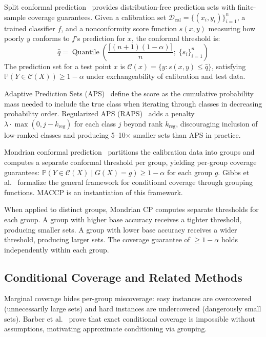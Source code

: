 \documentclass[conference]{IEEEtran}
\newcommand{\calD}{\mathcal{D}}
\newcommand{\calC}{\mathcal{C}}
\newcommand{\PP}{\mathbb{P}}
\DeclareMathOperator{\Quantile}{Quantile}
\begin{document}
Split conformal prediction~\cite{vovk2005algorithmic} provides distribution-free prediction sets with finite-sample coverage guarantees. Given a calibration set $\calD_\text{cal} = \{(x_i, y_i)\}_{i=1}^{n}$, a trained classifier $f$, and a nonconformity score function $s(x,y)$ measuring how poorly $y$ conforms to $f$'s prediction for $x$, the conformal threshold is:
\begin{equation}
\hat{q} = \Quantile\!\left(\frac{\lceil (n+1)(1-\alpha) \rceil}{n};\; \{s_i\}_{i=1}^{n}\right)
\end{equation}
The prediction set for a test point $x$ is $\calC(x) = \{y : s(x,y) \leq \hat{q}\}$, satisfying $\PP(Y \in \calC(X)) \geq 1 - \alpha$ under exchangeability of calibration and test data.

Adaptive Prediction Sets (APS)~\cite{romano2020classification} define the score as the cumulative probability mass needed to include the true class when iterating through classes in decreasing probability order. Regularized APS (RAPS)~\cite{angelopoulos2021uncertainty} adds a penalty $\lambda \cdot \max(0, j - k_\text{reg})$ for each class $j$ beyond rank $k_\text{reg}$, discouraging inclusion of low-ranked classes and producing 5--10$\times$ smaller sets than APS in practice.

Mondrian conformal prediction~\cite{vovk2005algorithmic} partitions the calibration data into groups and computes a separate conformal threshold per group, yielding per-group coverage guarantees: $\PP(Y \in \calC(X) \mid G(X) = g) \geq 1 - \alpha$ for each group $g$. Gibbs et al.~\cite{gibbs2025conditional} formalize the general framework for conditional coverage through grouping functions. MACCP is an instantiation of this framework.

When applied to distinct groups, Mondrian CP computes separate thresholds for each group. A group with higher base accuracy receives a tighter threshold, producing smaller sets. A group with lower base accuracy receives a wider threshold, producing larger sets. The coverage guarantee of $\geq 1 - \alpha$ holds independently within each group.

\subsection{Conditional Coverage and Related Methods}

Marginal coverage hides per-group miscoverage: easy instances are overcovered (unnecessarily large sets) and hard instances are undercovered (dangerously small sets). Barber et al.~\cite{barber2021impossibility} prove that exact conditional coverage is impossible without assumptions, motivating approximate conditioning via grouping.
\end{document}
